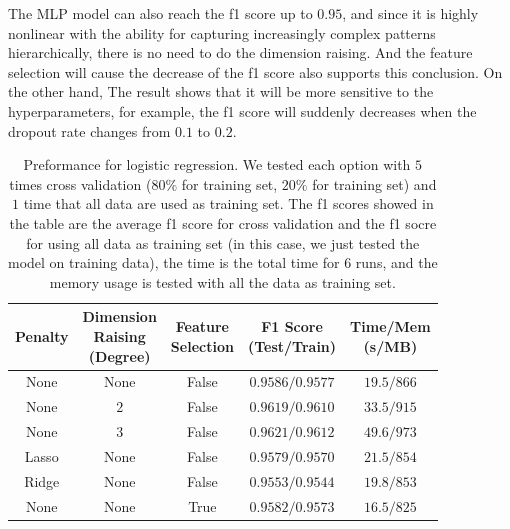 \documentclass[11pt]{article}
\begin{document}
The MLP model can also reach the f1 score up to $0.95$, and since it is highly nonlinear with the ability for capturing increasingly complex patterns hierarchically, there is no need to do the dimension raising. And the feature selection will cause the decrease of the f1 score also supports this conclusion. On the other hand, The result shows that it will be more sensitive to the hyperparameters, for example, the f1 score will suddenly decreases when the dropout rate changes from $0.1$ to $0.2$.

\begin{table}[H]
  \centering
  \begin{tabular}{|c|c|c|c|c|}
    \hline
    Penalty & \makecell{Dimension                                        \\ Raising \\ (Degree)} & \makecell{Feature \\ Selection} & \makecell{F1 Score \\ (Test/Train)} & \makecell{Time/Mem \\ (s/MB)} \\
    \hline
    None    & None                & False & $0.9586/0.9577$ & $19.5/866$ \\
    \hline
    None    & $2$                 & False & $0.9619/0.9610$ & $33.5/915$ \\
    \hline
    None    & $3$                 & False & $0.9621/0.9612$ & $49.6/973$ \\
    \hline
    Lasso   & None                & False & $0.9579/0.9570$ & $21.5/854$ \\
    \hline
    Ridge   & None                & False & $0.9553/0.9544$ & $19.8/853$ \\
    \hline
    None    & None                & True  & $0.9582/0.9573$ & $16.5/825$ \\
    \hline
  \end{tabular}
  \caption{Preformance for logistic regression. We tested each option with $5$ times cross validation ($80\%$ for training set, $20\%$ for training set) and $1$ time that all data are used as training set. The f1 scores showed in the table are the average f1 score for cross validation and the f1 socre for using all data as training set (in this case, we just tested the model on training data), the time is the total time for $6$ runs, and the memory usage is tested with all the data as training set.}
  \label{task-3-result-1}
\end{table}
\end{document}
